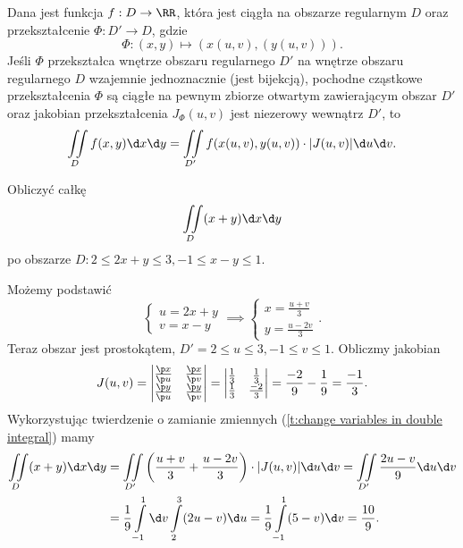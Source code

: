 \begin{theorem}
    \label{t:change variables in double integral}
    Dana jest funkcja $f : D \to \RR$, która jest ciągła na obszarze regularnym $D$ oraz przekształcenie $\varPhi : D' \to D$, gdzie
    \[ \varPhi : (x, y) \mapsto (x(u, v), (y(u, v))). \]
    Jeśli $\varPhi$ przekształca wnętrze obszaru regularnego $D'$ na wnętrze obszaru regularnego $D$ wzajemnie jednoznacznie (jest bijekcją), pochodne cząstkowe przekształcenia $\varPhi$ są ciągłe na pewnym zbiorze otwartym zawierającym obszar $D'$ oraz jakobian przekształcenia $J_\varPhi(u, v)$ jest niezerowy wewnątrz $D'$, to
    \[ \iint\limits_D f(x, y) \d x \d y = \iint\limits_{D'} f(x(u, v), y(u, v)) \cdot |J(u, v)| \d u \d v. \]
\end{theorem}

\begin{example}
    Obliczyć całkę
    \[ \iint\limits_D (x + y) \d x \d y \]
    po obszarze $D : 2 \leq 2x + y \leq 3, -1 \leq x - y \leq 1$.
\end{example}
\begin{solution}
    Możemy podstawić
    \[ \begin{cases} u = 2x + y \\ v = x - y \end{cases} \implies \begin{cases} x = \frac{u + v}{3} \\ y = \frac{u - 2v}{3} \end{cases}. \]
    Teraz obszar jest prostokątem, $D' = 2 \leq u \leq 3, -1 \leq v \leq 1$. Obliczmy jakobian
    \[ J(u, v) = \begin{vmatrix}
        \frac{\p x}{\p u} & \frac{\p x}{\p v} \\
        \frac{\p y}{\p u} & \frac{\p y}{\p v}
    \end{vmatrix} = \begin{vmatrix}
        \frac{1}{3} & \frac{1}{3} \\
        \frac{1}{3} & \frac{-2}{3}
    \end{vmatrix} = \frac{-2}{9} - \frac{1}{9} = \frac{-1}{3}. \]
    Wykorzystując twierdzenie o zamianie zmiennych (\ref{t:change variables in double integral}) mamy
    \begin{align*}
        \iint\limits_D (x + y) \d x \d y &= \iint\limits_{D'} \left(\frac{u + v}{3} + \frac{u - 2v}{3}\right) \cdot |J(u, v)| \d u \d v = \iint\limits_{D'} \frac{2u - v}{9} \d u \d v \\
        &= \frac{1}{9}\int\limits_{-1}^1 \d v \int\limits_2^3 (2u - v) \d u = \frac{1}{9}\int\limits_{-1}^1 (5 - v) \d v = \frac{10}{9}.
    \end{align*}
\end{solution}

